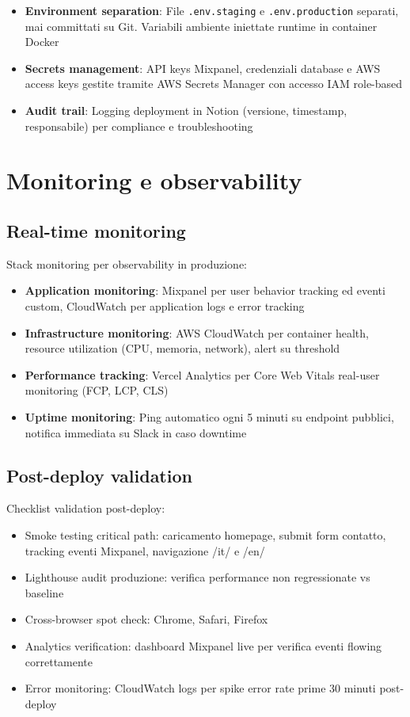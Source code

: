 \begin{itemize}
  \item \textbf{Environment separation}: File \texttt{.env.staging} e \texttt{.env.production} separati, mai committati su Git. Variabili ambiente iniettate runtime in container Docker
  \item \textbf{Secrets management}: API keys Mixpanel, credenziali database e AWS access keys gestite tramite AWS Secrets Manager con accesso IAM role-based
  \item \textbf{Audit trail}: Logging deployment in Notion (versione, timestamp, responsabile) per compliance e troubleshooting
\end{itemize}

\section{Monitoring e observability}

\subsection{Real-time monitoring}

Stack monitoring per observability in produzione:

\begin{itemize}
  \item \textbf{Application monitoring}: Mixpanel per user behavior tracking ed eventi custom, CloudWatch per application logs e error tracking
  \item \textbf{Infrastructure monitoring}: AWS CloudWatch per container health, resource utilization (CPU, memoria, network), alert su threshold
  \item \textbf{Performance tracking}: Vercel Analytics per Core Web Vitals real-user monitoring (FCP, LCP, CLS)
  \item \textbf{Uptime monitoring}: Ping automatico ogni 5 minuti su endpoint pubblici, notifica immediata su Slack in caso downtime
\end{itemize}

\subsection{Post-deploy validation}

Checklist validation post-deploy:

\begin{itemize}
  \item Smoke testing critical path: caricamento homepage, submit form contatto, tracking eventi Mixpanel, navigazione /it/ e /en/
  \item Lighthouse audit produzione: verifica performance non regressionate vs baseline
  \item Cross-browser spot check: Chrome, Safari, Firefox
  \item Analytics verification: dashboard Mixpanel live per verifica eventi flowing correttamente
  \item Error monitoring: CloudWatch logs per spike error rate prime 30 minuti post-deploy
\end{itemize}

